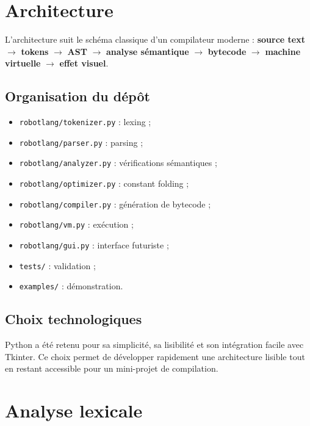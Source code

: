 \documentclass[12pt,a4paper]{article}
\begin{document}
\section{Architecture}

\begin{futuristicbox}
L'architecture suit le schéma classique d'un compilateur moderne :
\textbf{source text} $\rightarrow$ \textbf{tokens} $\rightarrow$ \textbf{AST}
$\rightarrow$ \textbf{analyse sémantique} $\rightarrow$ \textbf{bytecode}
$\rightarrow$ \textbf{machine virtuelle} $\rightarrow$ \textbf{effet visuel}.
\end{futuristicbox}

\subsection{Organisation du dépôt}

\begin{itemize}[nosep]
  \item \texttt{robotlang/tokenizer.py} : lexing ;
  \item \texttt{robotlang/parser.py} : parsing ;
  \item \texttt{robotlang/analyzer.py} : vérifications sémantiques ;
  \item \texttt{robotlang/optimizer.py} : constant folding ;
  \item \texttt{robotlang/compiler.py} : génération de bytecode ;
  \item \texttt{robotlang/vm.py} : exécution ;
  \item \texttt{robotlang/gui.py} : interface futuriste ;
  \item \texttt{tests/} : validation ;
  \item \texttt{examples/} : démonstration.
\end{itemize}

\subsection{Choix technologiques}

Python a été retenu pour sa simplicité, sa lisibilité et son intégration facile avec
Tkinter. Ce choix permet de développer rapidement une architecture lisible tout en restant
accessible pour un mini-projet de compilation.

\section{Analyse lexicale}
\end{document}
